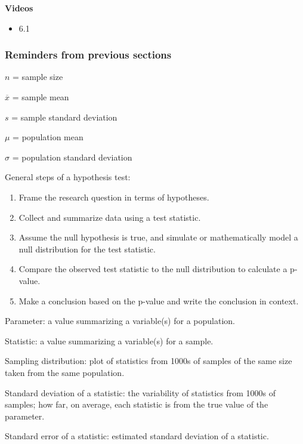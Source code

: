 \documentclass[
]{report}
\providecommand{\tightlist}{%
  \setlength{\itemsep}{0pt}\setlength{\parskip}{0pt}}
\begin{document}
\textbf{Videos}

\begin{itemize}
\tightlist
\item
  6.1
\end{itemize}


\hypertarget{reminders-from-previous-sections-5}{%
\subsubsection*{Reminders from previous sections}\label{reminders-from-previous-sections-5}}

\(n\) = sample size

\(\overline{x}\) = sample mean

\(s\) = sample standard deviation

\(\mu\) = population mean

\(\sigma\) = population standard deviation

General steps of a hypothesis test:

\begin{enumerate}
\def\labelenumi{\arabic{enumi}.}
\item
  Frame the research question in terms of hypotheses.
\item
  Collect and summarize data using a test statistic.
\item
  Assume the null hypothesis is true, and simulate or mathematically model a null distribution for the test statistic.
\item
  Compare the observed test statistic to the null distribution to calculate a p-value.
\item
  Make a conclusion based on the p-value and write the conclusion in context.
\end{enumerate}

Parameter: a value summarizing a variable(s) for a population.

Statistic: a value summarizing a variable(s) for a sample.

Sampling distribution: plot of statistics from 1000s of samples of the same size taken from the same population.

Standard deviation of a statistic: the variability of statistics from 1000s of samples; how far, on average, each statistic is from the true value of the parameter.

Standard error of a statistic: estimated standard deviation of a statistic.
\end{document}
